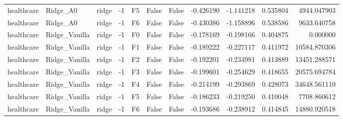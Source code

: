\begin{tabular}{lllrlllrrrr}
healthcare &                     Ridge\_A0 &         ridge &    -1 &  F5 &           False &            False & -0.426190 & -1.141218 & 0.535804 &      4944.047903 \\
healthcare &                     Ridge\_A0 &         ridge &    -1 &  F6 &           False &            False & -0.430386 & -1.158896 & 0.538586 &      9633.640758 \\
healthcare &                Ridge\_Vanilla &         ridge &    -1 &  F0 &           False &            False & -0.178169 & -0.198166 & 0.404875 &         0.000000 \\
healthcare &                Ridge\_Vanilla &         ridge &    -1 &  F1 &           False &            False & -0.189222 & -0.227117 & 0.411972 &     10584.870306 \\
healthcare &                Ridge\_Vanilla &         ridge &    -1 &  F2 &           False &            False & -0.192201 & -0.234981 & 0.413889 &     13451.288571 \\
healthcare &                Ridge\_Vanilla &         ridge &    -1 &  F3 &           False &            False & -0.199601 & -0.254629 & 0.418655 &     20575.694784 \\
healthcare &                Ridge\_Vanilla &         ridge &    -1 &  F4 &           False &            False & -0.214199 & -0.293869 & 0.428073 &     34648.561110 \\
healthcare &                Ridge\_Vanilla &         ridge &    -1 &  F5 &           False &            False & -0.186233 & -0.219250 & 0.410048 &      7708.860612 \\
healthcare &                Ridge\_Vanilla &         ridge &    -1 &  F6 &           False &            False & -0.193686 & -0.238912 & 0.414845 &     14880.920518 \\
\bottomrule
\end{tabular}
